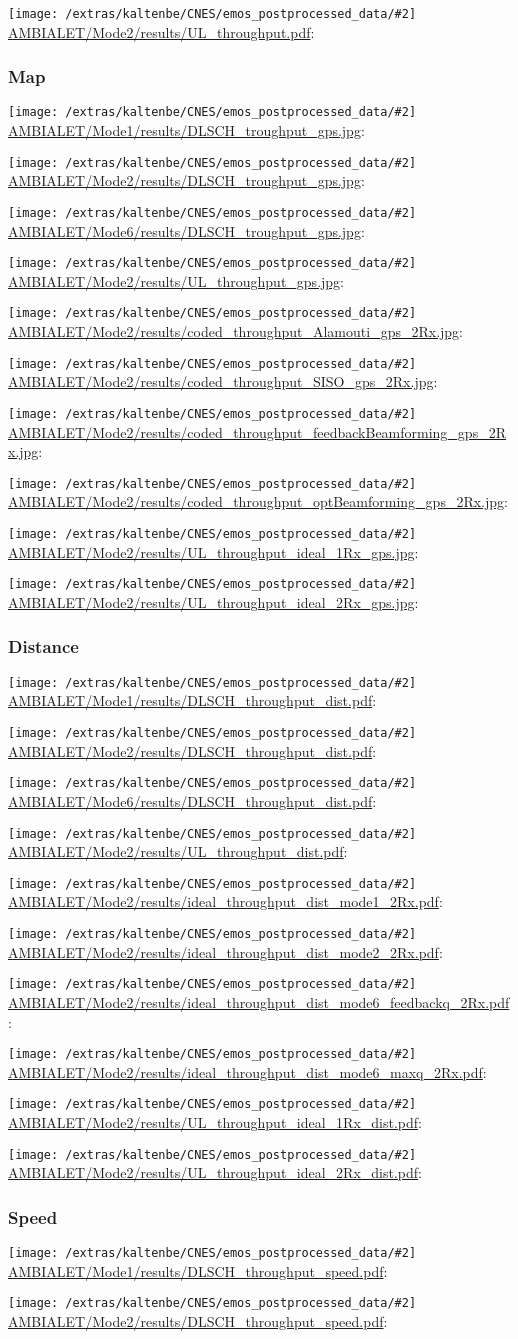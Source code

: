 \documentclass[a4paper,10pt]{article}
\newcommand{\printfile}[2][]{
 \begin{minipage}{8cm}
  \centering
  \texttt{[image: /extras/kaltenbe/CNES/emos\_postprocessed\_data/\#2]}
  \url{#2}: #1

 \end{minipage}
}
\begin{document}
\printfile{AMBIALET/Mode2/results/UL_throughput.pdf}


\subsubsection{Map}

\printfile{AMBIALET/Mode1/results/DLSCH_troughput_gps.jpg}
\printfile{AMBIALET/Mode2/results/DLSCH_troughput_gps.jpg}

\printfile{AMBIALET/Mode6/results/DLSCH_troughput_gps.jpg}
\printfile{AMBIALET/Mode2/results/UL_throughput_gps.jpg}

\printfile{AMBIALET/Mode2/results/coded_throughput_Alamouti_gps_2Rx.jpg}
\printfile{AMBIALET/Mode2/results/coded_throughput_SISO_gps_2Rx.jpg}

\printfile{AMBIALET/Mode2/results/coded_throughput_feedbackBeamforming_gps_2Rx.jpg}
\printfile{AMBIALET/Mode2/results/coded_throughput_optBeamforming_gps_2Rx.jpg}

\printfile{AMBIALET/Mode2/results/UL_throughput_ideal_1Rx_gps.jpg}
\printfile{AMBIALET/Mode2/results/UL_throughput_ideal_2Rx_gps.jpg}

\subsubsection{Distance}

\printfile{AMBIALET/Mode1/results/DLSCH_throughput_dist.pdf}
\printfile{AMBIALET/Mode2/results/DLSCH_throughput_dist.pdf}

\printfile{AMBIALET/Mode6/results/DLSCH_throughput_dist.pdf}
\printfile{AMBIALET/Mode2/results/UL_throughput_dist.pdf}

\printfile{AMBIALET/Mode2/results/ideal_throughput_dist_mode1_2Rx.pdf}
\printfile{AMBIALET/Mode2/results/ideal_throughput_dist_mode2_2Rx.pdf}

\printfile{AMBIALET/Mode2/results/ideal_throughput_dist_mode6_feedbackq_2Rx.pdf}
\printfile{AMBIALET/Mode2/results/ideal_throughput_dist_mode6_maxq_2Rx.pdf}

\printfile{AMBIALET/Mode2/results/UL_throughput_ideal_1Rx_dist.pdf}
\printfile{AMBIALET/Mode2/results/UL_throughput_ideal_2Rx_dist.pdf}

\subsubsection{Speed}

\printfile{AMBIALET/Mode1/results/DLSCH_throughput_speed.pdf}
\printfile{AMBIALET/Mode2/results/DLSCH_throughput_speed.pdf}
\end{document}
